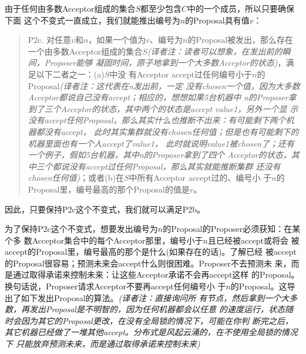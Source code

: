 由于任何由多数Acceptor组成的集合\(S\)都至少包含\(C\)中的一个成员，所以只要确保下面
这个不变式一直成立，我们就能推出编号为\(n\)的Proposal具有值\(v\)：

\begin{quote}
P2c. 对任意\(v\)和\(n\)，如果一个值为\(v\)、编号为\(n\)的Proposal被发出，那么存在
一个由多数Acceptor组成的集合\(S\)\emph{(译者注：读者可以想象，在发出前的瞬间，Proposer能够
凝固时间，原子地拿到一个大多数Acceptor的状态)}，满足以下二者之一：(a)\(S\)中没
有Acceptor accept过任何编号小于\(n\)的Proposal\emph{(译者注：这代表在n发出前，一定
没有chosen一个值，因为大多数Acceptor都说自己没有accept；相应的，想想如果5台机器中
n的Proposer拿到了三个Acceptor的状态，其中两个的状态是accept value1，另外一个显
示没有accept任何Proposal，那么其实什么也推断不出来：有可能剩下两个机器都没有accept，
此时其实集群就没有chosen任何值；但是也有可能剩下的机器里面也有一个人accept了value1，
此时就说明value1被chosen了；还有一个例子，假如5台机器，其中n的Proposer拿到了四个
Acceptor的状态，其中三个都说没有accept过任何Proposal，那么其实就能推断集群
还没有chosen任何值)}；或者(b)在\(S\)中所有Acceptor accept过的、编号小
于\(n\)的Proposal里，编号最高的那个Proposal的值是\(v\)。
\end{quote}

因此，只要保持P2c这个不变式，我们就可以满足P2b。

为了保持P2c这个不变式，想要发出编号为\(n\)的Proposal的Proposer必须获知：在某个多
数Acceptor集合中的每个Acceptor那里，编号小于\(n\)且已经被accept或将会
被accept的Proposal里，编号最高的那个是什么(如果存在的话)。了解已经
被accept的Proposal很容易；预测未来会accept什么则很困难。Proposer不去预测未
来，而是通过取得承诺来控制未来：让这些Acceptor承诺不会再accept这样
的Proposal。换句话说，Proposer请求Acceptor不要再accept任何编号小
于\(n\)的Proposal。这导出了如下发出Proposal的算法。\emph{(译者注：直接询问所
有节点，然后拿到一个大多数，再发出Proposal是不明智的，因为任何机器都会以任意
的速度运行，状态随时会因为其它的Proposal更改，在没有全局锁的情况下，可能在你判
断完之后，其它机器已经做了一堆其他accept。分布式是风起云涌的，在不使用全局锁的情况下
只能放弃预测未来，而是通过取得承诺来控制未来)}

